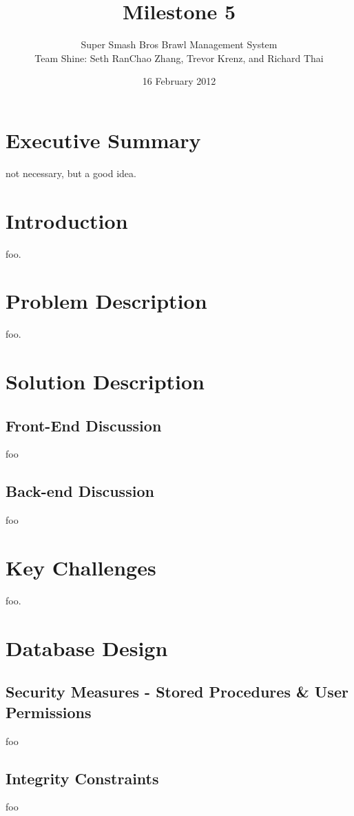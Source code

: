 \documentclass{article}
\begin{document}
\setlength{\voffset}{3.5in}
\title{Milestone 5}
\author{Super Smash Bros Brawl Management System \\
Team Shine: Seth RanChao Zhang, Trevor Krenz, and Richard Thai}
\date{16 February 2012}
\maketitle
\clearpage
\setlength{\voffset}{0pt}
\tableofcontents
\clearpage
\section{Executive Summary}
not necessary, but a good idea.

\section{Introduction}
foo.

\section{Problem Description}
foo.

\section{Solution Description}
\subsection{Front-End Discussion}
foo
\subsection{Back-end Discussion}
foo

\section{Key Challenges}
foo.

\section{Database Design}
\subsection{Security Measures - Stored Procedures \& User Permissions}
foo
\subsection{Integrity Constraints}
foo
\end{document}

